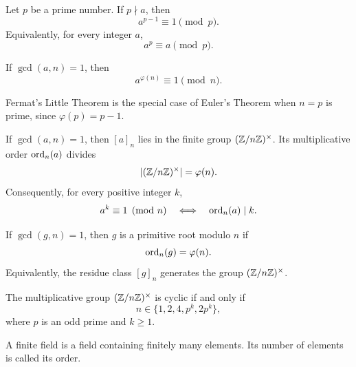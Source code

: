     \begin{theorem}
        Let $p$ be a prime number. If $p\nmid a$, then
        \[
            a^{p-1}\equiv 1\pmod p.
        \]
        Equivalently, for every integer $a$,
        \[
            a^p\equiv a\pmod p.
        \]
    \end{theorem}

    \begin{theorem}
        If $\gcd(a,n)=1$, then
        \[
            a^{\varphi(n)}\equiv 1\pmod n.
        \]
    \end{theorem}

    \begin{remark}
        Fermat's Little Theorem is the special case of Euler's Theorem when
        $n=p$ is prime, since $\varphi(p)=p-1$.
    \end{remark}

    \begin{proposition}
        If $\gcd(a,n)=1$, then $[a]_n$ lies in the finite group
        $(\mathbb{Z}/n\mathbb{Z})^\times$. Its multiplicative order $\operatorname{ord}_n(a)$ divides
        \[
            |(\mathbb{Z}/n\mathbb{Z})^\times|=\varphi(n).
        \]
        Consequently, for every positive integer $k$,
        \[
            a^k\equiv 1\pmod n
            \quad\Longleftrightarrow\quad
            \operatorname{ord}_n(a)\mid k.
        \]
    \end{proposition}

    \begin{definition}
        If $\gcd(g,n)=1$, then $g$ is a primitive root modulo $n$ if
        \[
            \operatorname{ord}_n(g)=\varphi(n).
        \]
        Equivalently, the residue class $[g]_n$ generates the group
        $(\mathbb{Z}/n\mathbb{Z})^\times$.
    \end{definition}

    \begin{theorem}
        The multiplicative group $(\mathbb{Z}/n\mathbb{Z})^\times$ is cyclic if and only if
        \[
            n\in\{1,2,4,p^k,2p^k\},
        \]
        where $p$ is an odd prime and $k\geq 1$.
    \end{theorem}

    \begin{definition}
        A finite field is a field containing finitely many elements. Its number
        of elements is called its order.
    \end{definition}

